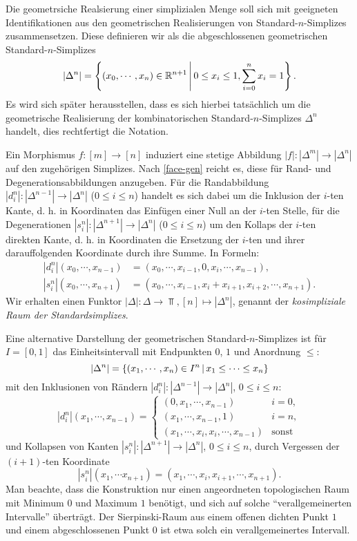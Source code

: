 Die geometrsiche Realsierung einer simplizialen Menge soll sich mit
geeigneten Identifikationen aus den geometrischen Realisierungen von
Standard-$n$-Simplizes zusammensetzen. Diese definieren wir als die
abgeschlossenen geometrischen Standard-$n$-Simplizes
\[ |\Delta^n| = \left\{ (x_0, \cdots, x_n) \in \mathbb{R}^{n+1} \,\middle|\, 0 \leq x_i \leq 1, \sum_{i=0}^n x_i = 1 \right\}. \]
Es wird sich später herausstellen, dass es sich hierbei tatsächlich um
die geometrische Realisierung der kombinatorischen
Standard-$n$-Simplizes $\Delta^n$ handelt, dies rechtfertigt die
Notation.

Ein Morphismus $f: [m] \to [n]$ induziert eine stetige Abbildung $|f|:
|\Delta^m| \to |\Delta^n|$ auf den zugehörigen Simplizes. Nach
\ref{face-gen} reicht es, diese für Rand- und Degenerationsabbildungen
anzugeben. Für die Randabbildung $|d_i^n|: |\Delta^{n-1}| \to
|\Delta^n|$ ($0 \leq i \leq n$) handelt es sich dabei um die Inklusion
der $i$-ten Kante, d. h. in Koordinaten das Einfügen einer Null an der
$i$-ten Stelle, für die Degenerationen $|s_i^n|: |\Delta^{n+1}| \to
|\Delta^n|$ ($0 \leq i \leq n$) um den Kollaps der $i$-ten direkten
Kante, d. h. in Koordinaten die Ersetzung der $i$-ten und ihrer
darauffolgenden Koordinate durch ihre Summe. In Formeln:
\begin{align*} \label{eq:cosimp-space}
  |d_i^n|(x_0, \cdots, x_{n-1})
  &= (x_0, \cdots, x_{i-1}, 0, x_i, \cdots, x_{n-1}), \\
  |s_i^n|(x_0, \cdots, x_{n+1})
  &= (x_0, \cdots, x_{i-1}, x_i + x_{i+1}, x_{i+2}, \cdots, x_{n+1}).
\end{align*}
Wir erhalten einen Funktor $|\Delta|: \Delta \to \Top, [n] \mapsto
|\Delta^n|$, genannt der \emph{kosimpliziale Raum der
  Standardsimplizes}.

\begin{bem} \label{gen-intervall}
  Eine alternative Darstellung der geometrischen
  Standard-$n$-Simplizes ist für $I = [0, 1]$ das Einheitsintervall
  mit Endpunkten $0$, $1$ und Anordnung $\leq$:
  \[ |\Delta^n| = \left\{ (x_1, \cdots, x_n) \in I^n \,\middle|\, x_1 \leq \cdots \leq x_n \right\} \]
  mit den Inklusionen von Rändern $|d_i^n|: |\Delta^{n-1}| \to
  |\Delta^n|$, $0 \leq i \leq n$:
  \[ |d_i^n|(x_1, \cdots, x_{n-1}) = 
  \begin{cases}
    (0, x_1, \cdots, x_{n-1}) & i = 0, \\ (x_1, \cdots, x_{n-1}, 1) &
    i = n, \\ (x_1, \cdots, x_i, x_i, \cdots, x_{n-1}) & \text{sonst}
  \end{cases}
  \]
  und Kollapsen von Kanten $|s_i^n|: |\Delta^{n+1}| \to |\Delta^{n}|$,
  $0 \leq i \leq n$, durch Vergessen der $(i+1)$-ten Koordinate
  \[ |s_i^n|(x_1, \cdots x_{n+1}) =
  (x_1, \cdots, x_i, x_{i+1}, \cdots, x_{n+1}).
  \]
  Man beachte, dass die Konstruktion nur einen angeordneten
  topologischen Raum mit Minimum $0$ und Maximum $1$ benötigt, und
  sich auf solche ``verallgemeinerten Intervalle'' überträgt. Der
  Sierpinski-Raum aus einem offenen dichten Punkt $1$ und einem
  abgeschlossenen Punkt $0$ ist etwa solch ein verallgemeinertes
  Intervall.
\end{bem}

